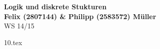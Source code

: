 \documentclass[letterpaper, 12pt, a4paper]{article}
\begin{document}


	\begin{center}
	{\Large{\bfseries{Logik und diskrete Stukturen}}}\\[0.5cm]
	{\large{\bfseries{Felix (2807144) \& Philipp (2583572) Müller}}}\\[0.4cm]
	WS 14/15
	\end{center}


	{10.tex}
\end{document}
